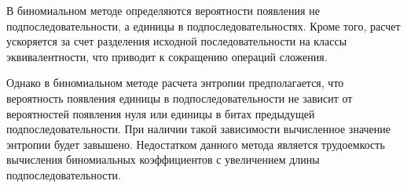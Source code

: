 В биномиальном методе определяются вероятности появления не подпоследовательности, а единицы в подпоследовательностях. Кроме того, расчет ускоряется за счет разделения исходной последовательности на классы эквивалентности, что приводит к сокращению операций сложения.

Однако в биномиальном методе расчета энтропии предполагается, что вероятность появления единицы в подпоследовательности не зависит от вероятностей появления нуля или единицы в битах предыдущей подпоследовательности. При наличии такой зависимости вычисленное значение энтропии будет завышено. Недостатком данного метода является трудоемкость вычисления биномиальных коэффициентов с увеличением длины подпоследовательности.
